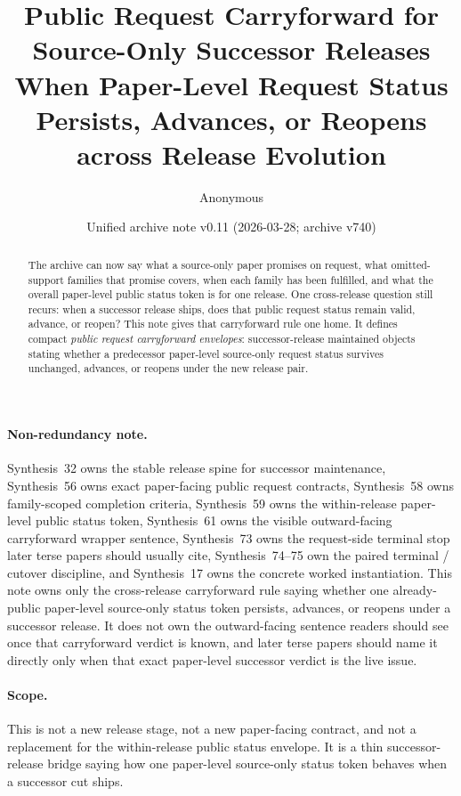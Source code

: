 \documentclass[11pt]{article}
\title{Public Request Carryforward for Source-Only Successor Releases\\\large When Paper-Level Request Status Persists, Advances, or Reopens across Release Evolution}
\author{Anonymous}
\date{Unified archive note v0.11 (2026-03-28; archive v740)}
\begin{document}
\maketitle

\begin{abstract}
The archive can now say what a source-only paper promises on request, what omitted-support families that promise covers, when each family has been fulfilled, and what the overall paper-level public status token is for one release. One cross-release question still recurs: when a successor release ships, does that public request status remain valid, advance, or reopen? This note gives that carryforward rule one home. It defines compact \emph{public request carryforward envelopes}: successor-release maintained objects stating whether a predecessor paper-level source-only request status survives unchanged, advances, or reopens under the new release pair.
\end{abstract}

\paragraph{Non-redundancy note.}
Synthesis~32 owns the stable release spine for successor maintenance, Synthesis~56 owns exact paper-facing public request contracts, Synthesis~58 owns family-scoped completion criteria, Synthesis~59 owns the within-release paper-level public status token, Synthesis~61 owns the visible outward-facing carryforward wrapper sentence, Synthesis~73 owns the request-side terminal stop later terse papers should usually cite, Synthesis~74--75 own the paired terminal / cutover discipline, and Synthesis~17 owns the concrete worked instantiation.\cite{series:releasespine,series:publicrequestcontracts,series:requestfulfillmentcertificates,series:publicrequeststatusenvelopes,series:publicrequestnotices,series:publicrequestresponsepacketrefreshresponsepacketclosureverdicts,series:pairedterminalcitationdiscipline,series:pairedterminalcutoverrule,series:workedexample}
This note owns only the cross-release carryforward rule saying whether one already-public paper-level source-only status token persists, advances, or reopens under a successor release. It does not own the outward-facing sentence readers should see once that carryforward verdict is known, and later terse papers should name it directly only when that exact paper-level successor verdict is the live issue.

\paragraph{Scope.}
This is not a new release stage, not a new paper-facing contract, and not a replacement for the within-release public status envelope.
It is a thin successor-release bridge saying how one paper-level source-only status token behaves when a successor cut ships.
\end{document}
